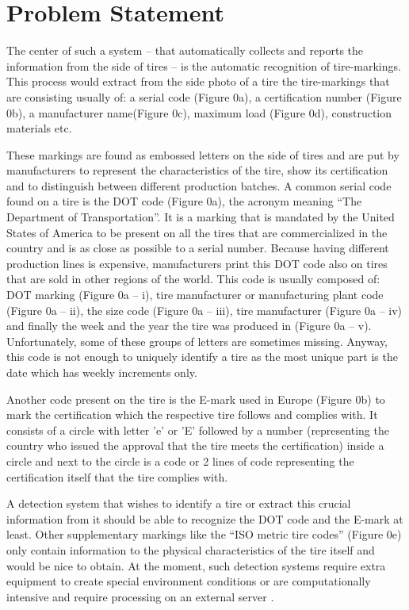 \section{Problem Statement}

The center of such a system -- that automatically collects and reports the information from the side of tires -- is the automatic recognition of tire-markings. This process would extract from the side photo of a tire the tire-markings that are consisting usually of: a serial code (Figure 0a), a certification number (Figure 0b), a manufacturer name(Figure 0c), maximum load (Figure 0d), construction materials etc.

These markings are found as embossed letters on the side of tires and are put by manufacturers to represent the characteristics of the tire, show its certification and to distinguish between different production batches. A common serial code found on a tire is the DOT code (Figure 0a), the acronym meaning “The Department of Transportation”. It is a marking that is mandated by the United States of America to be present on all the tires that are commercialized in the country and is as close as possible to a serial number. Because having different production lines is expensive, manufacturers print this DOT code also on tires that are sold in other regions of the world. This code is usually composed of: DOT marking (Figure 0a -- i), tire manufacturer or manufacturing plant code (Figure 0a -- ii), the size code (Figure 0a -- iii), tire manufacturer (Figure 0a -- iv) and finally the week and the year the tire was produced in (Figure 0a -- v). Unfortunately, some of these groups of letters are sometimes missing. Anyway, this code is not enough to uniquely identify a tire as the most unique part is the date which has weekly increments only.

Another code present on the tire is the E-mark used in Europe (Figure 0b) to mark the certification which the respective tire follows and complies with. It consists of a circle with letter 'e' or 'E' followed by a number (representing the country who issued the approval that the tire meets the certification) inside a circle and next to the circle is a code or 2 lines of code representing the certification itself that the tire complies with.

A detection system that wishes to identify a tire or extract this crucial information from it should be able to recognize the DOT code and the E-mark at least. Other supplementary markings like the “ISO metric tire codes” (Figure 0e) only contain information to the physical characteristics of the tire itself and would be nice to obtain. At the moment, such detection systems require extra equipment to create special environment conditions \cite{article:1} or are computationally intensive and require processing on an external server \cite{site:0}.

